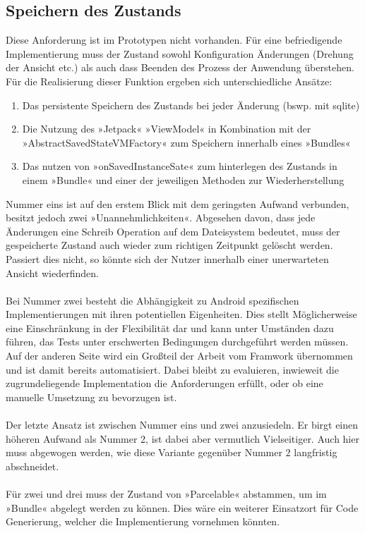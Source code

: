 \subsection{Speichern des Zustands}
\label{subsec:speicher-des-zustands}
Diese Anforderung ist im Prototypen nicht vorhanden. Für eine befriedigende Implementierung muss der Zustand sowohl Konfiguration Änderungen (Drehung der Ansicht etc.) als auch dass Beenden des Prozess der Anwendung überstehen. Für die Realisierung dieser Funktion ergeben sich unterschiedliche Ansätze:
\begin{enumerate}
	\item Das persistente Speichern des Zustands bei jeder Änderung (bswp. mit sqlite)
	\item Die Nutzung des »Jetpack« »ViewModel« in Kombination mit der »AbstractSavedStateVMFactory«
	zum Speichern innerhalb eines »Bundles«
	\item Das nutzen von »onSavedInstanceSate« zum hinterlegen des Zustands in einem »Bundle«  und einer der jeweiligen Methoden zur Wiederherstellung
\end{enumerate}
Nummer eins ist auf den erstem Blick mit dem geringsten Aufwand verbunden, besitzt jedoch zwei »Unannehmlichkeiten«. Abgesehen davon, dass jede Änderungen eine Schreib Operation auf dem Dateisystem bedeutet, muss der gespeicherte Zustand auch wieder zum richtigen Zeitpunkt gelöscht werden. Passiert dies nicht, so könnte sich der Nutzer innerhalb einer unerwarteten Ansicht wiederfinden.
\\\\
Bei Nummer zwei besteht die Abhängigkeit zu Android spezifischen Implementierungen mit ihren potentiellen Eigenheiten. Dies stellt Möglicherweise eine Einschränkung in der Flexibilität dar und kann unter Umständen dazu führen, das Tests unter erschwerten Bedingungen durchgeführt werden müssen. Auf der anderen Seite wird ein Großteil der Arbeit vom Framwork übernommen und ist damit bereits automatisiert. Dabei bleibt zu evaluieren, inwieweit die zugrundeliegende Implementation die Anforderungen erfüllt, oder ob eine manuelle Umsetzung zu bevorzugen ist.
\\\\
Der letzte Ansatz ist zwischen Nummer eins und zwei anzusiedeln. Er birgt einen höheren Aufwand als Nummer 2, ist dabei aber vermutlich Vielseitiger. Auch hier muss abgewogen werden, wie diese Variante gegenüber Nummer 2 langfristig abschneidet.
\\\\
Für zwei und drei muss der Zustand von »Parcelable« abstammen, um im »Bundle« abgelegt werden zu können. Dies wäre ein weiterer Einsatzort für Code Generierung, welcher die Implementierung vornehmen könnten. 

